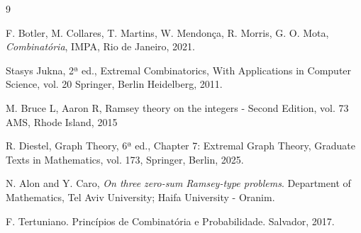 {\renewcommand{\refname}{}
\vspace{-\baselineskip}
\begin{thebibliography}{9}

  F. Botler, M. Collares, T. Martins, W. Mendonça, R. Morris, G. O. Mota, \textit{Combinatória}, IMPA, Rio de Janeiro, 2021.

Stasys Jukna, 2ª ed., Extremal Combinatorics, With Applications in Computer Science, vol. 20 Springer, Berlin Heidelberg, 2011.

M. Bruce L, Aaron R, Ramsey theory on the integers - Second Edition, vol. 73 AMS, Rhode Island, 2015

 R. Diestel, Graph Theory, 6ª ed., Chapter 7: Extremal Graph Theory, Graduate
Texts in Mathematics, vol. 173, Springer, Berlin, 2025.

N. Alon and Y. Caro,
\textit{On three zero-sum Ramsey-type problems}.
Department of Mathematics, Tel Aviv University; 
Haifa University - Oranim.

F. Tertuniano. Princípios de Combinatória e Probabilidade. Salvador, 2017.

\end{thebibliography}

}
